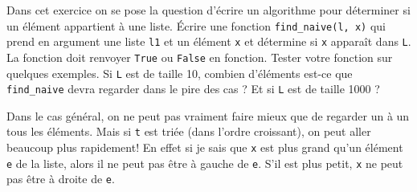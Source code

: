\exo
\begin{enonce} 
	Dans cet exercice on se pose la question d'écrire un algorithme pour déterminer si un élément appartient à une liste.
	\quessques Écrire une fonction \texttt{find\_naive(l, x)} qui prend en argument une liste \texttt{l1} et un élément \texttt{x} et détermine si \texttt{x} apparaît dans \texttt{L}. La fonction doit renvoyer \texttt{True} ou \texttt{False} en fonction.
	\ssques Tester votre fonction sur quelques exemples.
	\ssques Si \texttt{L} est de taille 10, combien d'éléments est-ce que \texttt{find\_naive} devra regarder dans le pire des cas ? Et si \texttt{L} est de taille 1000 ?

	Dans le cas général, on ne peut pas vraiment faire mieux que de regarder un à un tous les éléments. Mais si \texttt{t} est triée (dans l'ordre croissant), on peut aller beaucoup plus rapidement! En effet si je sais que \texttt{x} est plus grand qu'un élément \texttt{e} de la liste, alors il ne peut pas être à gauche de \texttt{e}. S'il est plus petit, \texttt{x} ne peut pas être à droite de \texttt{e}.


\end{enonce}
